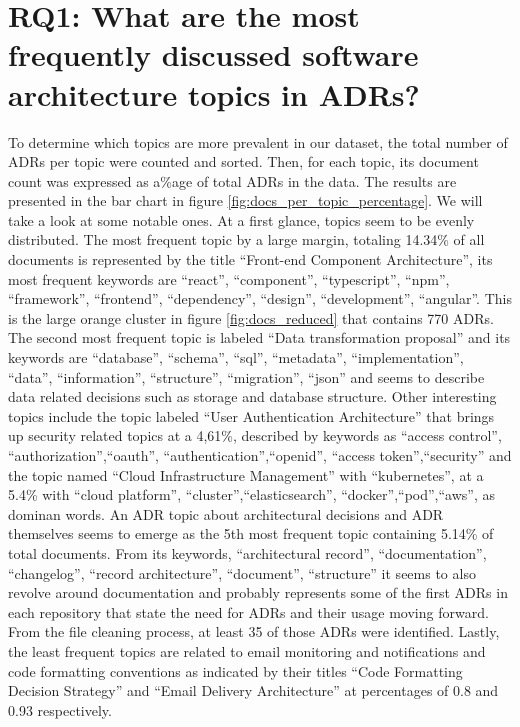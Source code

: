         

    \section{RQ1: What are the most frequently discussed software architecture topics in ADRs?}

        To determine which topics are more prevalent in our dataset, the total number of ADRs per topic were counted and sorted. Then, for each topic, its document count was expressed as a\%age of total ADRs in the data. The results are presented in the bar chart in figure \ref{fig:docs_per_topic_percentage}. We will take a look at some notable ones. At a first glance, topics seem to be evenly distributed. The most frequent topic by a large margin, totaling 14.34\% of all documents is represented by the title ``Front-end Component Architecture'', its most frequent keywords are ``react'', ``component'', ``typescript'', ``npm'', ``framework'', ``frontend'', ``dependency'', ``design'', ``development'', ``angular''. This is the large orange cluster in figure \ref{fig:docs_reduced} that contains 770 ADRs. The second most frequent topic is labeled ``Data transformation proposal'' and its keywords are ``database'', ``schema'', ``sql'', ``metadata'', ``implementation'', ``data'', ``information'', ``structure'', ``migration'', ``json'' and seems to describe data related decisions such as storage and database structure. Other interesting topics include the topic labeled ``User Authentication Architecture'' that brings up security related topics at a 4,61\%, described by keywords as ``access control'', ``authorization'',``oauth'', ``authentication'',``openid'', ``access token'',``security'' and the topic named ``Cloud Infrastructure Management'' with ``kubernetes'', at a 5.4\% with ``cloud platform'', ``cluster'',``elasticsearch'', ``docker'',``pod'',``aws'', as dominan words. An ADR topic about architectural decisions and ADR themselves seems to emerge as the 5th most frequent topic containing 5.14\% of total documents. From its keywords, ``architectural record'', ``documentation'', ``changelog'', ``record architecture'', ``document'', ``structure'' it seems to also revolve around documentation and probably represents some of the first ADRs in each repository that state the need for ADRs and their usage moving forward. From the file cleaning process, at least 35 of those ADRs were identified. Lastly, the least frequent topics are related to email monitoring and notifications and code formatting conventions as indicated by their titles ``Code Formatting Decision Strategy'' and ``Email Delivery Architecture'' at percentages of 0.8 and 0.93 respectively. 

